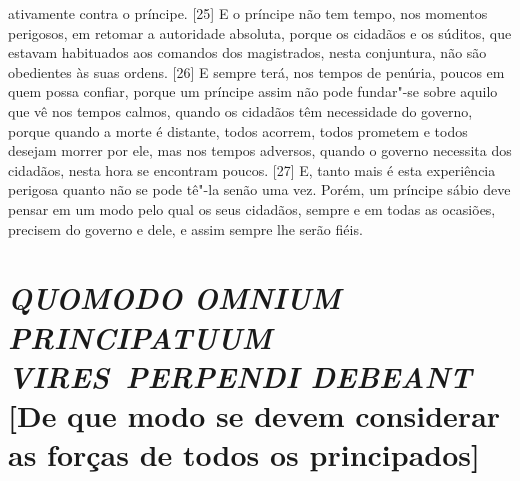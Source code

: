 ativamente contra o príncipe. {[}25{]} E o príncipe não tem tempo, nos
momentos perigosos, em retomar a autoridade absoluta, porque os cidadãos
e os súditos, que estavam habituados aos comandos dos magistrados, nesta
conjuntura, não são obedientes às suas ordens. {[}26{]} E sempre terá,
nos tempos de penúria, poucos em quem possa confiar, porque um príncipe
assim não pode fundar"-se sobre aquilo que vê nos tempos calmos, quando
os cidadãos têm necessidade do governo, porque quando a morte é
distante, todos acorrem, todos prometem e todos desejam morrer por ele,
mas nos tempos adversos, quando o governo necessita dos cidadãos, nesta
hora se encontram poucos. {[}27{]} E, tanto mais é esta experiência
perigosa quanto não se pode tê"-la senão uma vez. Porém, um príncipe
sábio deve pensar em um modo pelo qual os seus cidadãos, sempre e em
todas as ocasiões, precisem do governo e dele, e assim sempre lhe serão
fiéis.

\quebra\section{\emph{QUOMODO OMNIUM PRINCIPATUUM VIRES~PERPENDI DEBEANT}\break
{[}De que modo se devem considerar as forças de todos os principados{]}}

